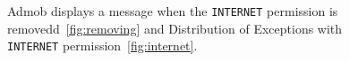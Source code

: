 \begin{figure}[h!]
\hfill
{}
\hfill
{}
\hfill
\caption{Admob displays a message when the \texttt{INTERNET} permission is removedd~\ref{fig:removing} and Distribution of Exceptions with \texttt{INTERNET} permission~\ref{fig:internet}.}
\end{figure}


